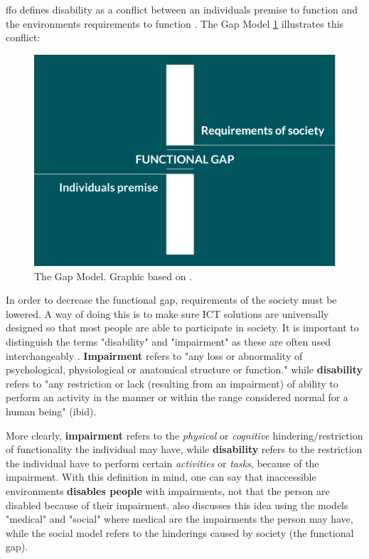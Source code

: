 \acrfull{ffo} defines disability as a conflict between an individuals premise to function and the environments requirements to function \parencite{funksjonshemmedes_fellesorganisasjon_ffo_definisjon_2013}. The Gap Model \ref{fig:gap_model} illustrates this conflict: 
\begin{figure}[H]
  \includegraphics[width=\linewidth]{img/gapmodel.png}
  \caption{The Gap Model. Graphic based on \textcite{difi_kvifor_2016}.}\label{fig:gap_model}
\endminipage\hfill
\end{figure}
In order to decrease the functional gap, requirements of the society must be lowered. A way of doing this is to make sure ICT solutions are universally designed so that most people are able to participate in society. 
It is important to distinguish the terms "disability" and "impairment" as these are often used interchangeably \parencite{sheena_l._carter_impairment_????}. \textbf{Impairment} refers to "any loss or abnormality of psychological, physiological or anatomical structure or function." while \textbf{disability} refers to "any restriction or lack (resulting from an impairment) of ability to perform an activity in the manner or within the range considered normal for a human being" (ibid). 

More clearly, \textbf{impairment} refers to the \textit{physical} or \textit{cognitive} hindering/restriction of functionality the individual may have, while \textbf{disability} refers to the restriction the individual have to perform certain \textit{activities} or \textit{tasks}, because of the impairment. With this definition in mind, one can say that inaccessible environments \textbf{disables people} with impairments, not that the person are disabled because of their impairment. \textcite{world_health_organization_world_2011} also discusses this idea using the models "medical" and "social" where medical are the impairments the person may have, while the social model refers to the hinderings caused by society (the functional gap).

